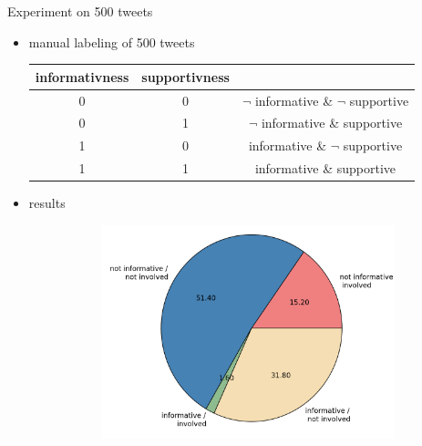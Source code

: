 \documentclass[first=dblue,second=red,logo=blueexc]{aaltoslides}
\begin{document}
\begin{frame}{Experiment on 500 tweets}
\begin{itemize}
\item manual labeling of 500 tweets
\begin{center}
\footnotesize
\begin{tabular}{ccc}
informativness & supportivness & ~ \\ \hline
0 & 0 & $\neg$ informative \& $\neg$ supportive \\ \hline
0 & 1 & $\neg$ informative \& supportive \\ \hline
1 & 0 & informative \& $\neg$ supportive \\ \hline
1 & 1 & informative \& supportive \\ \hline
\end{tabular}
\end{center}
\item results
\begin{figure}[H]
\begin{subfigure}[t]{0.47\textwidth}
\centering
\includegraphics[width=\textwidth]{images/plots/pies/pie_pairs.png}
\end{subfigure}
\hfill
\begin{subfigure}[t]{0.42\textwidth}
\centering

\end{subfigure}
\end{figure}
\end{itemize}
\end{frame}
\end{document}
